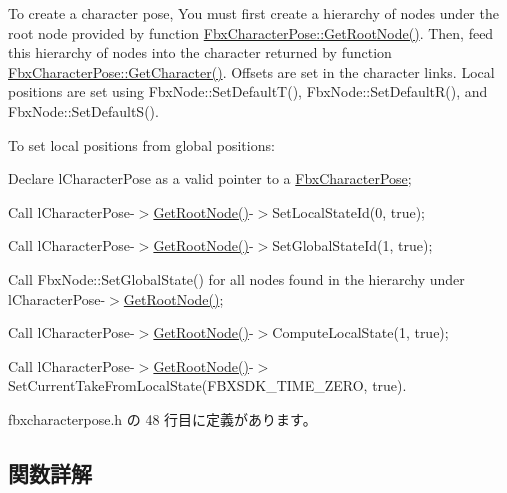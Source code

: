 To create a character pose, You must first create a hierarchy of nodes under the root node provided by function \hyperlink{class_fbx_character_pose_a7dd8f39dcef2c74844a3d367a67a681b}{Fbx\+Character\+Pose\+::\+Get\+Root\+Node()}. Then, feed this hierarchy of nodes into the character returned by function \hyperlink{class_fbx_character_pose_ac0429f7f15902a3eeb0c50e890529cde}{Fbx\+Character\+Pose\+::\+Get\+Character()}. Offsets are set in the character links. Local positions are set using Fbx\+Node\+::\+Set\+Default\+T(), Fbx\+Node\+::\+Set\+Default\+R(), and Fbx\+Node\+::\+Set\+Default\+S().

To set local positions from global positions\+:
\begin{DoxyEnumerate}
\item Declare l\+Character\+Pose as a valid pointer to a \hyperlink{class_fbx_character_pose}{Fbx\+Character\+Pose};
\item Call l\+Character\+Pose-\/$>$\hyperlink{class_fbx_character_pose_a7dd8f39dcef2c74844a3d367a67a681b}{Get\+Root\+Node()}-\/$>$Set\+Local\+State\+Id(0, true);
\item Call l\+Character\+Pose-\/$>$\hyperlink{class_fbx_character_pose_a7dd8f39dcef2c74844a3d367a67a681b}{Get\+Root\+Node()}-\/$>$Set\+Global\+State\+Id(1, true);
\item Call Fbx\+Node\+::\+Set\+Global\+State() for all nodes found in the hierarchy under l\+Character\+Pose-\/$>$\hyperlink{class_fbx_character_pose_a7dd8f39dcef2c74844a3d367a67a681b}{Get\+Root\+Node()};
\item Call l\+Character\+Pose-\/$>$\hyperlink{class_fbx_character_pose_a7dd8f39dcef2c74844a3d367a67a681b}{Get\+Root\+Node()}-\/$>$Compute\+Local\+State(1, true);
\item Call l\+Character\+Pose-\/$>$\hyperlink{class_fbx_character_pose_a7dd8f39dcef2c74844a3d367a67a681b}{Get\+Root\+Node()}-\/$>$Set\+Current\+Take\+From\+Local\+State(\+F\+B\+X\+S\+D\+K\+\_\+\+T\+I\+M\+E\+\_\+\+Z\+E\+R\+O, true). 
\end{DoxyEnumerate}

 fbxcharacterpose.\+h の 48 行目に定義があります。



\subsection{関数詳解}
\mbox{\label{class_fbx_character_pose_af191f8d48c8f11e795adcb92adae35c5}} 
